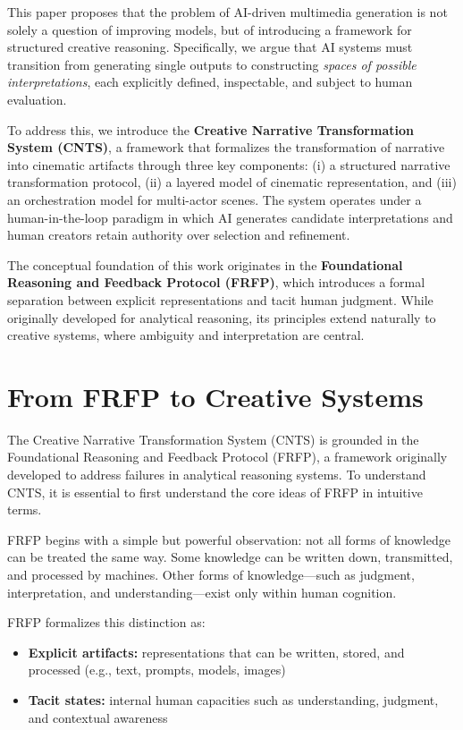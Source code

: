 \documentclass[preprints,article,submit,pdftex,moreauthors,accept]{Definitions/mdpi}
\begin{document}
This paper proposes that the problem of AI-driven multimedia generation is not solely a question of improving models, but of introducing a framework for structured creative reasoning. Specifically, we argue that AI systems must transition from generating single outputs to constructing \emph{spaces of possible interpretations}, each explicitly defined, inspectable, and subject to human evaluation.

To address this, we introduce the \textbf{Creative Narrative Transformation System (CNTS)}, a framework that formalizes the transformation of narrative into cinematic artifacts through three key components: (i) a structured narrative transformation protocol, (ii) a layered model of cinematic representation, and (iii) an orchestration model for multi-actor scenes. The system operates under a human-in-the-loop paradigm in which AI generates candidate interpretations and human creators retain authority over selection and refinement.

The conceptual foundation of this work originates in the \textbf{Foundational Reasoning and Feedback Protocol (FRFP)}, which introduces a formal separation between explicit representations and tacit human judgment. While originally developed for analytical reasoning, its principles extend naturally to creative systems, where ambiguity and interpretation are central.

\section{From FRFP to Creative Systems }

The Creative Narrative Transformation System (CNTS) is grounded in the Foundational Reasoning and Feedback Protocol (FRFP), a framework originally developed to address failures in analytical reasoning systems. To understand CNTS, it is essential to first understand the core ideas of FRFP in intuitive terms.

FRFP begins with a simple but powerful observation: not all forms of knowledge can be treated the same way. Some knowledge can be written down, transmitted, and processed by machines. Other forms of knowledge—such as judgment, interpretation, and understanding—exist only within human cognition.

FRFP formalizes this distinction as:

\begin{itemize}
    \item \textbf{Explicit artifacts:} representations that can be written, stored, and processed (e.g., text, prompts, models, images)
    \item \textbf{Tacit states:} internal human capacities such as understanding, judgment, and contextual awareness
\end{itemize}
\end{document}
